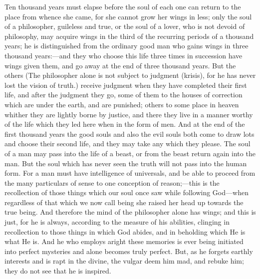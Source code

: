 \documentclass[11pt,letter]{article}
\begin{document}
\par  Ten thousand years must elapse before the soul of each one can return to the place from whence she came, for she cannot grow her wings in less; only the soul of a philosopher, guileless and true, or the soul of a lover, who is not devoid of philosophy, may acquire wings in the third of the recurring periods of a thousand years; he is distinguished from the ordinary good man who gains wings in three thousand years:—and they who choose this life three times in succession have wings given them, and go away at the end of three thousand years. But the others (The philosopher alone is not subject to judgment (krisis), for he has never lost the vision of truth.) receive judgment when they have completed their first life, and after the judgment they go, some of them to the houses of correction which are under the earth, and are punished; others to some place in heaven whither they are lightly borne by justice, and there they live in a manner worthy of the life which they led here when in the form of men. And at the end of the first thousand years the good souls and also the evil souls both come to draw lots and choose their second life, and they may take any which they please. The soul of a man may pass into the life of a beast, or from the beast return again into the man. But the soul which has never seen the truth will not pass into the human form. For a man must have intelligence of universals, and be able to proceed from the many particulars of sense to one conception of reason;—this is the recollection of those things which our soul once saw while following God—when regardless of that which we now call being she raised her head up towards the true being. And therefore the mind of the philosopher alone has wings; and this is just, for he is always, according to the measure of his abilities, clinging in recollection to those things in which God abides, and in beholding which He is what He is. And he who employs aright these memories is ever being initiated into perfect mysteries and alone becomes truly perfect. But, as he forgets earthly interests and is rapt in the divine, the vulgar deem him mad, and rebuke him; they do not see that he is inspired.
\end{document}

